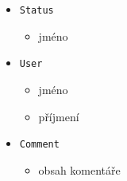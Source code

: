 \documentclass[11pt,oneside]{fithesis2}
\begin{document}
\begin{itemize}
\begin{itemize}
		\end{itemize}
	\item \texttt{Status}
		\begin{itemize}
			\item jméno
		\end{itemize}
	\item \texttt{User}
		\begin{itemize}
			\item jméno
			\item příjmení
		\end{itemize}
	\item \texttt{Comment}
		\begin{itemize}
			\item obsah komentáře
		\end{itemize}
\end{itemize}


\end{document}
